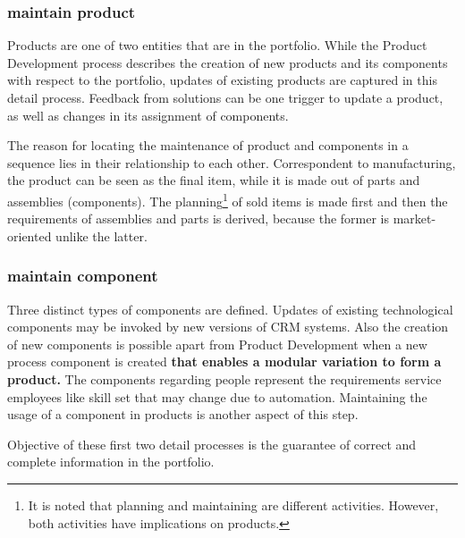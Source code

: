 		\subsubsection{maintain product}
		Products are one of two entities that are in the portfolio. While the Product Development process describes the creation of new products and its components with respect to the portfolio, updates of existing products are captured in this detail process. Feedback from solutions can be one trigger to update a product, as well as changes in its assignment of components. 
		
		The reason for locating the maintenance of product and components in a sequence lies in their relationship to each other. Correspondent to manufacturing, the product can be seen as the final item, while it is made out of parts and assemblies (components). The planning\footnote{It is noted that planning and maintaining are different activities. However, both activities have implications on products.} of sold items is made first and then the requirements of assemblies and parts is derived, because the former is market-oriented unlike the latter. 
		
		\subsubsection{maintain component}
		Three distinct types of components are defined. Updates of existing technological components may be invoked by new versions of \acrshort{CRM} systems. Also the creation of new components is possible apart from Product Development when a new process component is created \textbf{that enables a modular variation to form a product.} The components regarding people represent the requirements \wrt service employees like skill set that may change due to automation. Maintaining the usage of a component in products is another aspect of this step. 
		
		Objective of these first two detail processes is the guarantee of correct and complete information in the portfolio.
		
